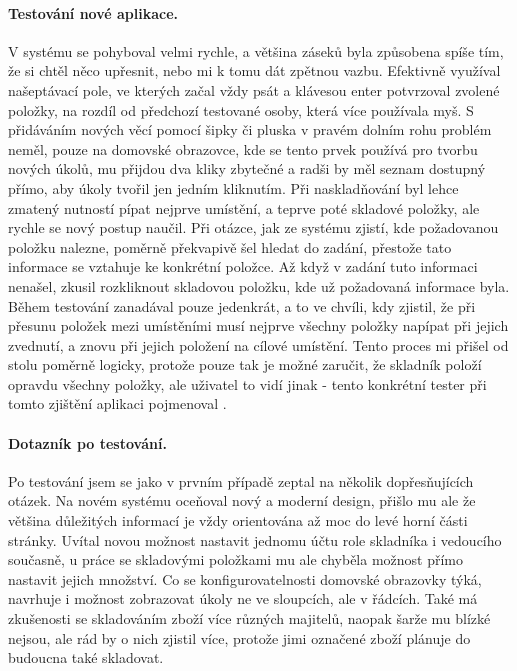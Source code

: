 \paragraph{Testování nové aplikace.} V systému se pohyboval velmi rychle, a většina záseků byla způsobena spíše tím, že si chtěl něco upřesnit, nebo mi k tomu dát zpětnou vazbu. Efektivně využíval našeptávací pole, ve kterých začal vždy psát a klávesou enter potvrzoval zvolené položky, na rozdíl od předchozí testované osoby, která více používala myš. S přidáváním nových věcí pomocí šipky či pluska v pravém dolním rohu problém neměl, pouze na domovské obrazovce, kde se tento prvek používá pro tvorbu nových úkolů, mu přijdou dva kliky zbytečné a radši by měl seznam dostupný přímo, aby úkoly tvořil jen jedním kliknutím. Při naskladňování byl lehce zmatený nutností pípat nejprve umístění, a teprve poté skladové položky, ale rychle se nový postup naučil. Při otázce, jak ze systému zjistí, kde požadovanou položku nalezne, poměrně překvapivě šel hledat do zadání, přestože tato informace se vztahuje ke konkrétní položce. Až když v zadání tuto informaci nenašel, zkusil rozkliknout skladovou položku, kde už požadovaná informace byla. Během testování zanadával pouze jedenkrát, a to ve chvíli, kdy zjistil, že při přesunu položek mezi umístěními musí nejprve všechny položky napípat při jejich zvednutí, a znovu při jejich položení na cílové umístění. Tento proces mi přišel od stolu poměrně logicky, protože pouze tak je možné zaručit, že skladník položí opravdu všechny položky, ale uživatel to vidí jinak - tento konkrétní tester při tomto zjištění aplikaci pojmenoval .

\paragraph{Dotazník po testování.} Po testování jsem se jako v prvním případě zeptal na několik dopřesňujících otázek. Na novém systému oceňoval nový a moderní design, přišlo mu ale že většina důležitých informací je vždy orientována až moc do levé horní části stránky. Uvítal novou možnost nastavit jednomu účtu role skladníka i vedoucího současně, u práce se skladovými položkami mu ale chyběla možnost přímo nastavit jejich množství. Co se konfigurovatelnosti domovské obrazovky týká, navrhuje i možnost zobrazovat úkoly ne ve sloupcích, ale v řádcích. Také má zkušenosti se skladováním zboží více různých majitelů, naopak šarže mu blízké nejsou, ale rád by o nich zjistil více, protože jimi označené zboží plánuje do budoucna také skladovat.

